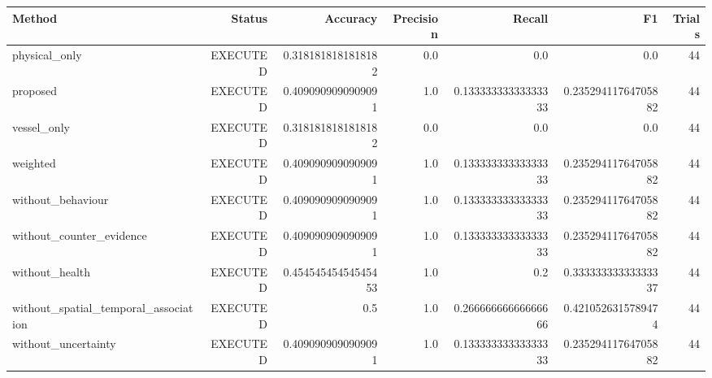 \begin{tabular}{lrrrrrr}
\toprule
Method & Status & Accuracy & Precision & Recall & F1 & Trials \\
\midrule
physical\_only & EXECUTED & 0.3181818181818182 & 0.0 & 0.0 & 0.0 & 44 \\
proposed & EXECUTED & 0.4090909090909091 & 1.0 & 0.13333333333333333 & 0.23529411764705882 & 44 \\
vessel\_only & EXECUTED & 0.3181818181818182 & 0.0 & 0.0 & 0.0 & 44 \\
weighted & EXECUTED & 0.4090909090909091 & 1.0 & 0.13333333333333333 & 0.23529411764705882 & 44 \\
without\_behaviour & EXECUTED & 0.4090909090909091 & 1.0 & 0.13333333333333333 & 0.23529411764705882 & 44 \\
without\_counter\_evidence & EXECUTED & 0.4090909090909091 & 1.0 & 0.13333333333333333 & 0.23529411764705882 & 44 \\
without\_health & EXECUTED & 0.45454545454545453 & 1.0 & 0.2 & 0.33333333333333337 & 44 \\
without\_spatial\_temporal\_association & EXECUTED & 0.5 & 1.0 & 0.26666666666666666 & 0.4210526315789474 & 44 \\
without\_uncertainty & EXECUTED & 0.4090909090909091 & 1.0 & 0.13333333333333333 & 0.23529411764705882 & 44 \\
\bottomrule
\end{tabular}
